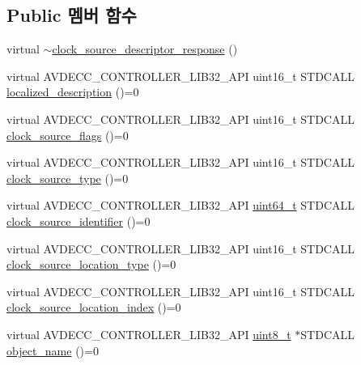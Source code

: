 \subsection*{Public 멤버 함수}
\begin{DoxyCompactItemize}
\item 
virtual \hyperlink{classavdecc__lib_1_1clock__source__descriptor__response_a20265e86d4c25d0345d6f449ec12d228}{$\sim$clock\+\_\+source\+\_\+descriptor\+\_\+response} ()
\item 
virtual A\+V\+D\+E\+C\+C\+\_\+\+C\+O\+N\+T\+R\+O\+L\+L\+E\+R\+\_\+\+L\+I\+B32\+\_\+\+A\+PI uint16\+\_\+t S\+T\+D\+C\+A\+LL \hyperlink{classavdecc__lib_1_1clock__source__descriptor__response_a1fb9de45567df344090a1407aa6b775f}{localized\+\_\+description} ()=0
\item 
virtual A\+V\+D\+E\+C\+C\+\_\+\+C\+O\+N\+T\+R\+O\+L\+L\+E\+R\+\_\+\+L\+I\+B32\+\_\+\+A\+PI uint16\+\_\+t S\+T\+D\+C\+A\+LL \hyperlink{classavdecc__lib_1_1clock__source__descriptor__response_a56c79adbce8dc216dcf75ef9d07f9d8d}{clock\+\_\+source\+\_\+flags} ()=0
\item 
virtual A\+V\+D\+E\+C\+C\+\_\+\+C\+O\+N\+T\+R\+O\+L\+L\+E\+R\+\_\+\+L\+I\+B32\+\_\+\+A\+PI uint16\+\_\+t S\+T\+D\+C\+A\+LL \hyperlink{classavdecc__lib_1_1clock__source__descriptor__response_a284b9325d868e1cdc4aca47aa760bc67}{clock\+\_\+source\+\_\+type} ()=0
\item 
virtual A\+V\+D\+E\+C\+C\+\_\+\+C\+O\+N\+T\+R\+O\+L\+L\+E\+R\+\_\+\+L\+I\+B32\+\_\+\+A\+PI \hyperlink{parse_8c_aec6fcb673ff035718c238c8c9d544c47}{uint64\+\_\+t} S\+T\+D\+C\+A\+LL \hyperlink{classavdecc__lib_1_1clock__source__descriptor__response_a95e00a145734c8713b7bf377b8e59dcf}{clock\+\_\+source\+\_\+identifier} ()=0
\item 
virtual A\+V\+D\+E\+C\+C\+\_\+\+C\+O\+N\+T\+R\+O\+L\+L\+E\+R\+\_\+\+L\+I\+B32\+\_\+\+A\+PI uint16\+\_\+t S\+T\+D\+C\+A\+LL \hyperlink{classavdecc__lib_1_1clock__source__descriptor__response_aeed570325d78c18b6b90bd00d68c610a}{clock\+\_\+source\+\_\+location\+\_\+type} ()=0
\item 
virtual A\+V\+D\+E\+C\+C\+\_\+\+C\+O\+N\+T\+R\+O\+L\+L\+E\+R\+\_\+\+L\+I\+B32\+\_\+\+A\+PI uint16\+\_\+t S\+T\+D\+C\+A\+LL \hyperlink{classavdecc__lib_1_1clock__source__descriptor__response_a4446f500b6899c943f47d25eda285fa8}{clock\+\_\+source\+\_\+location\+\_\+index} ()=0
\item 
virtual A\+V\+D\+E\+C\+C\+\_\+\+C\+O\+N\+T\+R\+O\+L\+L\+E\+R\+\_\+\+L\+I\+B32\+\_\+\+A\+PI \hyperlink{stdint_8h_aba7bc1797add20fe3efdf37ced1182c5}{uint8\+\_\+t} $\ast$S\+T\+D\+C\+A\+LL \hyperlink{classavdecc__lib_1_1descriptor__response__base_a133f7774946d80f82b8aaaa4cfbb7361}{object\+\_\+name} ()=0
\end{DoxyCompactItemize}


